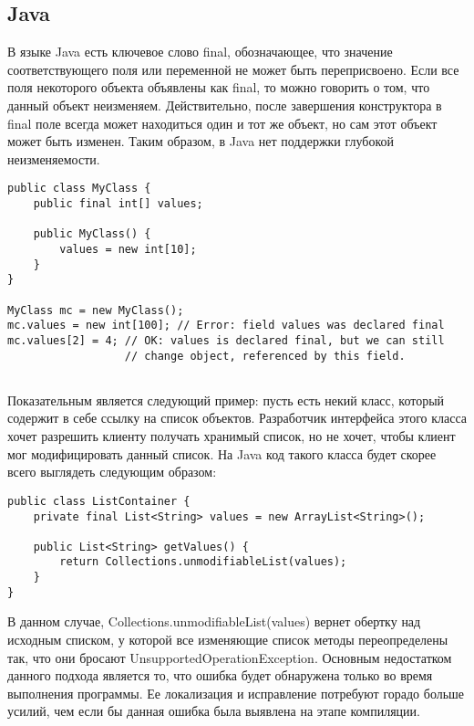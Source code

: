 \subsection{Java}

В языке Java есть ключевое слово final, обозначающее, что значение соответствующего поля или переменной не может быть переприсвоено. Если все поля некоторого объекта объявлены как final, то можно говорить о том, что данный объект неизменяем. Действительно, после завершения конструктора в final поле всегда может находиться один и тот же объект, но сам этот объект может быть изменен. Таким образом, в Java нет поддержки глубокой неизменяемости.

\begin{lstlisting}[caption=Ключевое слово final, label=code:java_final]
public class MyClass {
    public final int[] values;
	
    public MyClass() {
        values = new int[10];    
    }	
}

MyClass mc = new MyClass();
mc.values = new int[100]; // Error: field values was declared final
mc.values[2] = 4; // OK: values is declared final, but we can still
                  // change object, referenced by this field.
    
\end{lstlisting}


Показательным является следующий пример: пусть есть некий класс, который содержит в себе ссылку на список объектов. Разработчик интерфейса этого класса хочет разрешить клиенту получать хранимый список, но не хочет, чтобы клиент мог модифицировать данный список. На Java код такого класса будет скорее всего выглядеть следующим образом:

\begin{lstlisting}[caption=Неизменяемый список, label=code:java_immutable_list]
public class ListContainer {
    private final List<String> values = new ArrayList<String>();   
    
    public List<String> getValues() {
        return Collections.unmodifiableList(values);
    }    
}
\end{lstlisting}

В данном случае, Collections.unmodifiableList(values) вернет обертку над исходным списком, у которой все изменяющие список методы переопределены так, что они бросают UnsupportedOperationException. Основным недостатком данного подхода является то, что ошибка будет обнаружена только во время выполнения программы. Ее локализация и исправление потребуют горадо больше усилий, чем если бы данная ошибка была выявлена на этапе компиляции.

